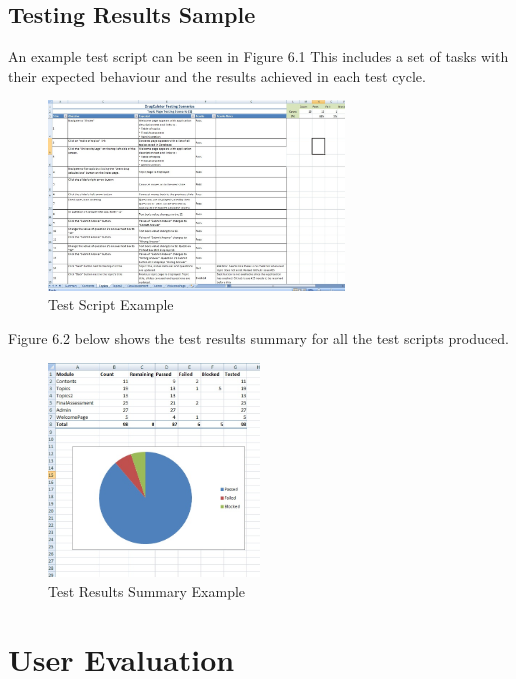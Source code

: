 \documentclass{l3proj}
\begin{document}

\subsection{Testing Results Sample}

An example test script can be seen in Figure 6.1 This includes a set of tasks with their expected behaviour and the results achieved in each test cycle. 

\begin{figure}[!htb]
\caption{Test Script Example}
 \centering
\includegraphics[width=0.7\textwidth]{images/TopicTest.jpg}
\end{figure}


Figure 6.2 below shows the test results summary for all the test scripts produced. 

\begin{figure}[!htb]
\caption{Test Results Summary Example}
 \centering
\includegraphics[width=0.5\textwidth]{images/TestResultsSummary.jpg}
\end{figure}

\section{User Evaluation}
\end{document}
